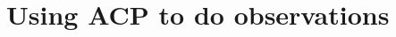 \documentclass[letterpaper, 12pt]{report}
\begin{document}

\newpage

\chapter{Using ACP to do observations} %
\label{cha:using_acp_to_do_observations}
\end{document}
